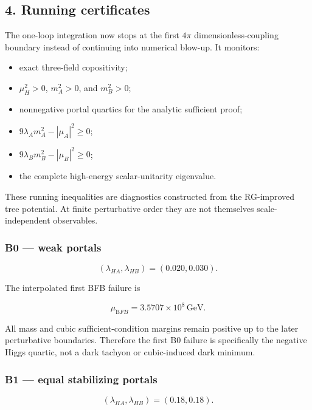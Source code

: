 \documentclass[
]{article}
\providecommand{\tightlist}{%
  \setlength{\itemsep}{0pt}\setlength{\parskip}{0pt}}
\begin{document}
\hypertarget{running-certificates}{%
\subsection{4. Running certificates}\label{running-certificates}}

The one-loop integration now stops at the first \(4\pi\)
dimensionless-coupling boundary instead of continuing into numerical
blow-up. It monitors:

\begin{itemize}
\tightlist
\item
  exact three-field copositivity;
\item
  \(\mu_H^2>0\), \(m_A^2>0\), and \(m_B^2>0\);
\item
  nonnegative portal quartics for the analytic sufficient proof;
\item
  \(9\lambda_A m_A^2-|\mu_A|^2\ge0\);
\item
  \(9\lambda_B m_B^2-|\mu_B|^2\ge0\);
\item
  the complete high-energy scalar-unitarity eigenvalue.
\end{itemize}

These running inequalities are diagnostics constructed from the
RG-improved tree potential. At finite perturbative order they are not
themselves scale-independent observables.

\hypertarget{b0-weak-portals-1}{%
\subsubsection{B0 --- weak portals}\label{b0-weak-portals-1}}

\[
(\lambda_{HA},\lambda_{HB})=(0.020,0.030).
\]

The interpolated first BFB failure is

\[
\mu_{\mathrm BFB}=3.5707\times10^8\,\mathrm{GeV}.
\]

All mass and cubic sufficient-condition margins remain positive up to
the later perturbative boundaries. Therefore the first B0 failure is
specifically the negative Higgs quartic, not a dark tachyon or
cubic-induced dark minimum.

\hypertarget{b1-equal-stabilizing-portals}{%
\subsubsection{B1 --- equal stabilizing
portals}\label{b1-equal-stabilizing-portals}}

\[
(\lambda_{HA},\lambda_{HB})=(0.18,0.18).
\]
\end{document}
